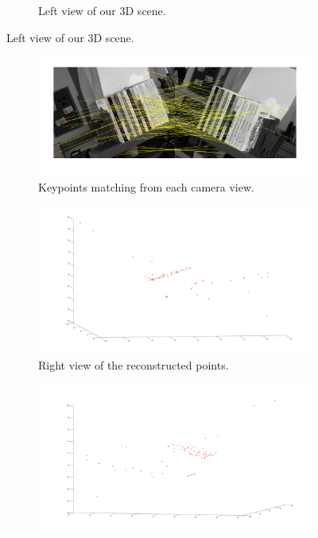 \documentclass[12pt]{article}
\begin{document}
\begin{figure}[htbp]
\begin{subfigure}[b]{0.45\textwidth}
                \caption{Left view of our 3D scene.}
                \label{fig:blender2}
        \end{subfigure}
\end{figure}

\begin{figure}[htbp]
		\ContinuedFloat
		\centering
        \begin{subfigure}[b]{0.45\textwidth}
                \includegraphics[width=\textwidth]{images/reconstructionMatching}
                \caption{Keypoints matching from each camera view.}
                \label{fig:stereoMatching}
        \end{subfigure}
        \begin{subfigure}[b]{0.45\textwidth}
                \includegraphics[width=\textwidth]{images/reconstruction1}
                \caption{Right view of the reconstructed points.}
                \label{fig:stereoRecons1}
        \end{subfigure}
        \begin{subfigure}[b]{0.45\textwidth}
                \includegraphics[width=\textwidth]{images/reconstruction3}

\end{subfigure}
\end{figure}
\end{document}
